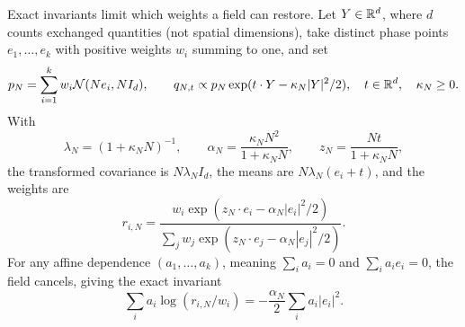 Exact invariants limit which weights a field can restore. Let
$Y\in\mathbb R^d$, where $d$ counts exchanged quantities (not spatial
dimensions), take distinct phase points $e_1,\ldots,e_k$ with
positive weights $w_i$ summing to one, and set
\begin{equation}
 p_N=\sum_{i=1}^k w_i\mathcal N(Ne_i,NI_d),\qquad
 q_{N,t}\propto p_N\exp(t\cdot Y-\kappa_N|Y|^2/2),
 \quad t\in\mathbb R^d,\quad\kappa_N\ge0.
 \label{eq:multivariate-gaussian-model}
\end{equation}
With
\begin{equation}
 \lambda_N=(1+\kappa_NN)^{-1},\qquad
 \alpha_N=\frac{\kappa_NN^2}{1+\kappa_NN},\qquad
 z_N=\frac{Nt}{1+\kappa_NN},
 \label{eq:multivariate-parameters}
\end{equation}
the transformed covariance is $N\lambda_NI_d$, the means are
$N\lambda_N(e_i+t)$, and the weights are
\begin{equation}
 r_{i,N}=\frac{w_i\exp(z_N\cdot e_i-\alpha_N|e_i|^2/2)}
                 {\sum_jw_j\exp(z_N\cdot e_j-\alpha_N|e_j|^2/2)}.
 \label{eq:multivariate-weights}
\end{equation}
For any affine dependence $(a_1,\ldots,a_k)$, meaning
$\sum_i a_i=0$ and $\sum_i a_ie_i=0$, the field cancels, giving the
exact invariant
\begin{equation}
 \sum_i a_i\log(r_{i,N}/w_i)
       =-\frac{\alpha_N}{2}\sum_i a_i|e_i|^2.
 \label{eq:multivariate-invariant}
\end{equation}

